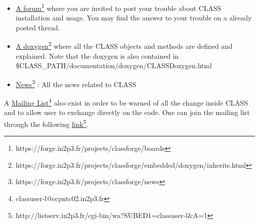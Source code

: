 \begin{itemize}
\item \href{https://forge.in2p3.fr/projects/classforge/boards}{A forum}\footnote{https://forge.in2p3.fr/projects/classforge/boards} where you are invited to post your trouble about CLASS installation and usage. You may find the answer to your trouble on a already posted thread.
\item \href{https://forge.in2p3.fr/projects/classforge/embedded/doxygen/inherits.html}{A doxygen}\footnote{https://forge.in2p3.fr/projects/classforge/embedded/doxygen/inherits.html} where all the CLASS objects and methods are defined and explained. Note that the doxygen is also contained in \$CLASS\_PATH/documentation/doxygen/CLASSDoxygen.html
\item \href{https://forge.in2p3.fr/projects/classforge/news}{News}\footnote{https://forge.in2p3.fr/projects/classforge/news} : All the news related to CLASS
\end{itemize}
A \href{classuser-l@ccpntc02.in2p3.fr}{Mailing List}\footnote{classuser-l@ccpntc02.in2p3.fr} also exist in order to be warned of all the change inside CLASS and to allow user to exchange directly on the code. One can join the mailing list through the following  \href{http://listserv.in2p3.fr/cgi-bin/wa?SUBED1=classuser-l&A=1}{link}\footnote{http://listserv.in2p3.fr/cgi-bin/wa?SUBED1=classuser-l\&A=1}.



